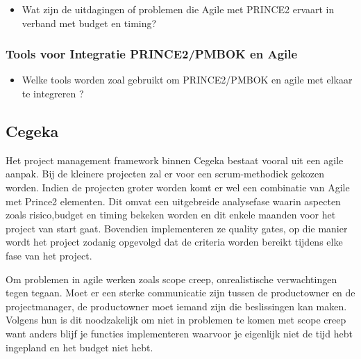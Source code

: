 \documentclass[dutch]{hogent-article}
\begin{document}
\begin{itemize}
    \item Wat zijn de uitdagingen of problemen die Agile met PRINCE2 ervaart in verband met budget en timing?
\end{itemize}

\subsubsection{Tools voor Integratie PRINCE2/PMBOK en Agile}
\label{ssec:geslaagde-en-niet-geslaagde-projecten}

\begin{itemize}
    \item Welke tools worden zoal gebruikt om PRINCE2/PMBOK en agile met elkaar te integreren ?
\end{itemize}

\subsection{Cegeka}
\label{ssec:Inetum-Cegeka}

Het project management framework binnen Cegeka bestaat vooral uit een agile aanpak. Bij de kleinere projecten zal er voor een scrum-methodiek gekozen worden.
Indien de projecten groter worden komt er wel een combinatie van Agile met Prince2 elementen. Dit omvat een uitgebreide analysefase waarin aspecten zoals risico,budget en timing bekeken worden en dit enkele maanden voor het project van start gaat. Bovendien implementeren ze quality gates, op die manier wordt het project zodanig opgevolgd dat de criteria worden bereikt tijdens elke fase van het project.
\newline

Om problemen in agile werken zoals scope creep, onrealistische verwachtingen tegen tegaan. Moet er een sterke communicatie zijn tussen de productowner en de projectmanager, de productowner moet iemand zijn die beslissingen kan maken. Volgens hun is dit noodzakelijk om niet in problemen te komen met scope creep want anders blijf je functies implementeren waarvoor je eigenlijk niet de tijd hebt ingepland en het budget niet hebt. 
\newline
\end{document}
